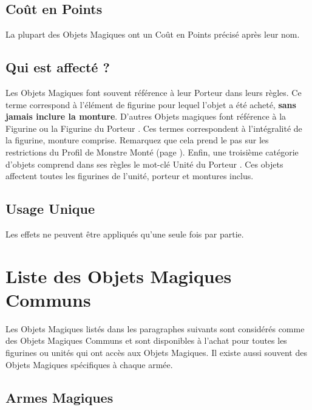 \subsection{Coût en Points}

La plupart des Objets Magiques ont un Coût en Points précisé après leur nom.

\subsection{Qui est affecté ?}

Les Objets Magiques font souvent référence à leur \og Porteur \fg{} dans leurs règles. Ce terme correspond à l'élément de figurine pour lequel l'objet a été acheté, \textbf{sans jamais inclure la monture}. D'autres Objets magiques font référence à la \og Figurine \fg{} ou la \og Figurine du Porteur \fg{}. Ces termes correspondent à l'intégralité de la figurine, monture comprise. Remarquez que cela prend le pas sur les restrictions du Profil de Monstre Monté (page \pageref{ridden_monster_profile}). Enfin, une troisième catégorie d'objets comprend dans ses règles le mot-clé \og Unité du Porteur \fg{}. Ces objets affectent toutes les figurines de l'unité, porteur et montures inclus.

\subsection{Usage Unique}

Les effets ne peuvent être appliqués qu'une seule fois par partie.

\newpage

\section{Liste des Objets Magiques Communs}

Les Objets Magiques listés dans les paragraphes suivants sont considérés comme des Objets Magiques Communs et sont disponibles à l'achat pour toutes les figurines ou unités qui ont accès aux Objets Magiques. Il existe aussi souvent des Objets Magiques spécifiques à chaque armée.

\hypertarget{magicalweapons}{\subsection{Armes Magiques}}
\label{magical_weapons}

\startpricelist

